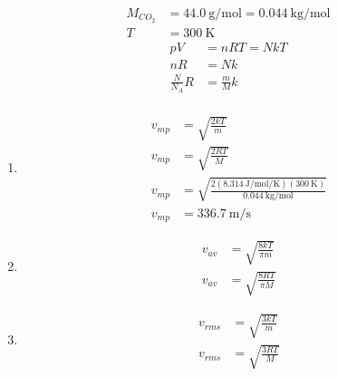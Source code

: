 \documentclass{article}
\begin{document}
\begin{align*}
	M_{CO_2} & = \SI{44.0}{\gram \per \mole} = \SI{0.044}{\kilogram \per \mole} \\
	T & = \SI{300}{\kelvin}
\end{align*}
\begin{align*}
	pV & = nRT = NkT \\
	nR & = Nk \\
	\frac{ N }{ N_A } R & = \frac{ m }{ M } k \\
\end{align*}
\begin{enumerate}[label = \textbf{(\alph*)}]
	\item
		\begin{align*}
			v_{mp} & = \sqrt{ \frac{ 2kT }{ m } } \\
			v_{mp} & = \sqrt{ \frac{ 2RT}{ M } } \\
			v_{mp} & = \sqrt{ \frac{ 2(\SI{8.314}{\joule \per \mole \per \kelvin})(\SI{300}{\kelvin}) }{ \SI{0.044}{\kilogram \per \mole} } } \\
			v_{mp} & = \SI{336.7}{\meter \per \second}
		\end{align*}
	\item
		\begin{align*}
			v_{av} & = \sqrt{ \frac{ 8kT }{ \pi m } } \\
			v_{av} & = \sqrt{ \frac{ 8RT }{ \pi M } }
		\end{align*}
	\item
		\begin{align*}
			v_{rms} & = \sqrt{ \frac{ 3kT }{ m } } \\
			v_{rms} & = \sqrt{ \frac{ 3RT }{ M } }
		\end{align*}
\end{enumerate}
\end{document}
